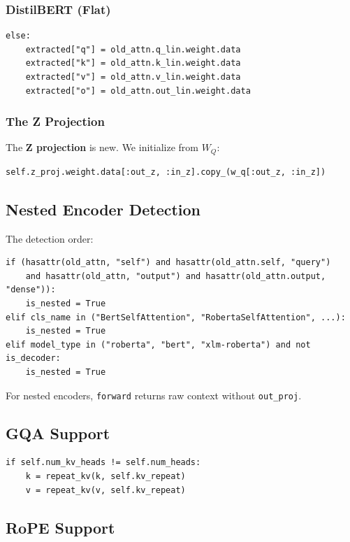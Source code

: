\subsubsection{DistilBERT (Flat)}

\begin{lstlisting}
else:
    extracted["q"] = old_attn.q_lin.weight.data
    extracted["k"] = old_attn.k_lin.weight.data
    extracted["v"] = old_attn.v_lin.weight.data
    extracted["o"] = old_attn.out_lin.weight.data
\end{lstlisting}

\subsubsection{The Z Projection}

The \textbf{Z projection} is new. We initialize from $W_Q$:

\begin{lstlisting}
self.z_proj.weight.data[:out_z, :in_z].copy_(w_q[:out_z, :in_z])
\end{lstlisting}

\subsection{Nested Encoder Detection}

The detection order:

\begin{lstlisting}
if (hasattr(old_attn, "self") and hasattr(old_attn.self, "query")
    and hasattr(old_attn, "output") and hasattr(old_attn.output, "dense")):
    is_nested = True
elif cls_name in ("BertSelfAttention", "RobertaSelfAttention", ...):
    is_nested = True
elif model_type in ("roberta", "bert", "xlm-roberta") and not is_decoder:
    is_nested = True
\end{lstlisting}

For nested encoders, \texttt{forward} returns raw context without \texttt{out\_proj}.

\subsection{GQA Support}

\begin{lstlisting}
if self.num_kv_heads != self.num_heads:
    k = repeat_kv(k, self.kv_repeat)
    v = repeat_kv(v, self.kv_repeat)
\end{lstlisting}

\subsection{RoPE Support}

